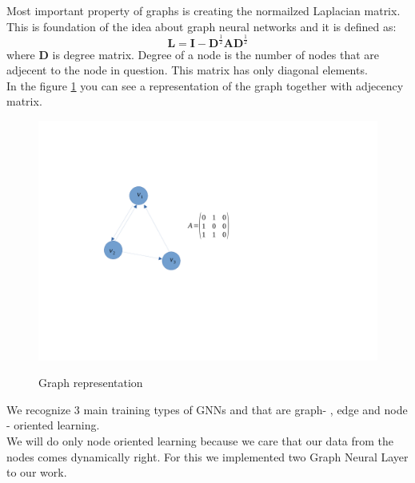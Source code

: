 Most important property of graphs is creating the normailzed Laplacian matrix. This is foundation of the idea about graph neural networks and it is defined as:
\begin{equation}
	\mathbf{L}= \mathbf{I} - \mathbf{D}^{\frac{1}{2}}\mathbf{A}\mathbf{D}^{\frac{1}{2}} 
\end{equation} where $\mathbf{D}$ is degree matrix. Degree of a node is the number of nodes that are adjecent to the node in question. This matrix has only diagonal elements.\\
In the figure \ref{graph} you can see a representation of the graph together with adjecency matrix.
\begin{figure}[h!]
	\includegraphics[width=15cm]{chapters/chapter4/graph}
	\label{graph}
	\caption{Graph representation}
\end{figure}
We recognize 3 main training types of GNNs and that are graph- , edge and node - oriented learning.\\
We will do only node oriented learning because we care that our data from the nodes comes dynamically right. For this we implemented two Graph Neural Layer to our work. 

